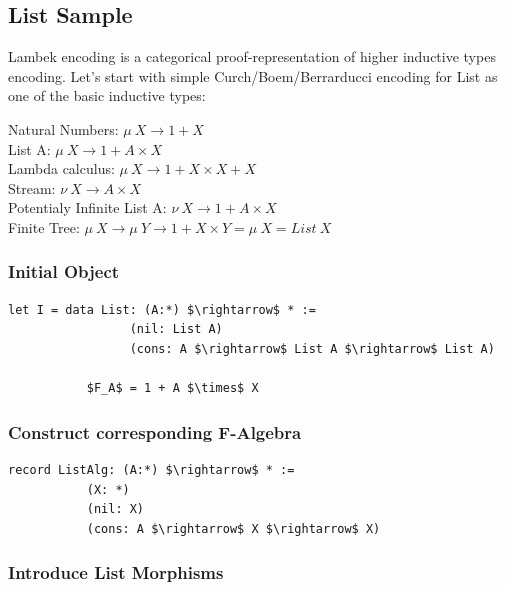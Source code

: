 \documentclass[11pt,oneside]{article}
\begin{document}
\subsection{List Sample}
  Lambek encoding is a categorical proof-representation of higher inductive types encoding.
  Let's start with simple Curch/Boem/Berrarducci encoding for List as one of the basic inductive types:

\begin{center}
  Natural Numbers: $\mu\ X \rightarrow 1 + X$ \\
  List A: $\mu\ X \rightarrow 1 + A \times X$ \\
  Lambda calculus: $\mu\ X \rightarrow 1 + X \times X + X$ \\
  Stream: $\nu\ X \rightarrow A \times X$ \\
  Potentialy Infinite List A: $\nu\ X \rightarrow 1 + A \times X$ \\
  Finite Tree: $\mu\ X \rightarrow \mu\ Y \rightarrow 1 + X \times Y = \mu\ X = List\ X$ \\
\end{center}

\subsubsection*{Initial Object}

\begin{lstlisting}[mathescape=true]
    let I = data List: (A:*) $\rightarrow$ * :=
                 (nil: List A)
                 (cons: A $\rightarrow$ List A $\rightarrow$ List A)

           $F_A$ = 1 + A $\times$ X
\end{lstlisting}

\subsubsection*{Construct corresponding F-Algebra}

\begin{lstlisting}[mathescape=true]
    record ListAlg: (A:*) $\rightarrow$ * :=
           (X: *)
           (nil: X)
           (cons: A $\rightarrow$ X $\rightarrow$ X)

\end{lstlisting}

\subsubsection*{Introduce List Morphisms}
\end{document}
